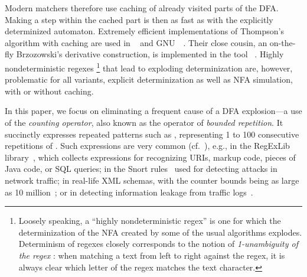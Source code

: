 \documentclass[acmsmall,screen]{acmart}
\begin{document}
Modern matchers therefore use caching of already visited parts of the 
DFA.
Making a step within the cached part is then as fast as with the explicitly determinized automaton.
%
Extremely efficient implementations of Thompson's algorithm with caching are used in
\retwo~\cite{re2} and GNU~\grep~\cite{grep}.
Their close cousin, an on-the-fly Brzozowski's derivative construction, is
implemented in the tool \srm~\cite{VSXW19}.
%
Highly nondeterministic regexes%
\footnote{
Loosely speaking, 
a ``highly nondeterministic regex'' is one for which the determinization of the
NFA created by some of the usual algorithms explodes. Determinism of regexes
closely corresponds to the notion of \emph{1-unambiguity of the regex} \cite{BW98,Hovland09}: when matching a text from left to right against the regex, it is always clear which letter of the regex matches the text character. 
}
 that lead to exploding determinization are, however, problematic for all variants, explicit determinization as well as NFA simulation, with or without caching.
%

In this paper, we focus on eliminating a frequent cause of a DFA explosion---a use of
%
the \emph{counting operator}, also known as the operator of \emph{bounded repetition}. 
%
It succinctly expresses repeated patterns such as ,
representing 1 to 100 consecutive repetitions of .
%
Such expressions are very common (cf.~\cite{cikm15}), e.g., in the RegExLib
library~\cite{regexlib}, which collects expressions for recognizing URIs, markup
code, pieces of Java code, or SQL queries; in the Snort rules~\cite{snort} used
for detecting attacks in network traffic; in real-life XML schemas, with the
counter bounds being as large as 10 million~\cite{cikm15};
%
or in detecting information leakage from traffic
logs~\cite{aplas19}. 
\end{document}
